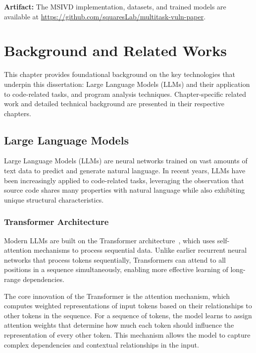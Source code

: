 \documentclass[12pt,openany,oneside,table]{cmuthesis}
\begin{document}
\textbf{Artifact:} The MSIVD implementation, datasets, and trained models are available at \url{https://github.com/squaresLab/multitask-vuln-paper}.




\chapter{Background and Related Works}
\label{ch:background}

This chapter provides foundational background on the key technologies that underpin this dissertation: Large Language Models (LLMs) and their application to code-related tasks, and program analysis techniques. Chapter-specific related work and detailed technical background are presented in their respective chapters.

\section{Large Language Models}

Large Language Models (LLMs) are neural networks trained on vast amounts of text data to predict and generate natural language. In recent years, LLMs have been increasingly applied to code-related tasks, leveraging the observation that source code shares many properties with natural language while also exhibiting unique structural characteristics.

\subsection{Transformer Architecture}

Modern LLMs are built on the Transformer architecture~\cite{vaswani2017attention}, which uses self-attention mechanisms to process sequential data. Unlike earlier recurrent neural networks that process tokens sequentially, Transformers can attend to all positions in a sequence simultaneously, enabling more effective learning of long-range dependencies.

The core innovation of the Transformer is the attention mechanism, which computes weighted representations of input tokens based on their relationships to other tokens in the sequence. For a sequence of tokens, the model learns to assign attention weights that determine how much each token should influence the representation of every other token. This mechanism allows the model to capture complex dependencies and contextual relationships in the input.
\end{document}
